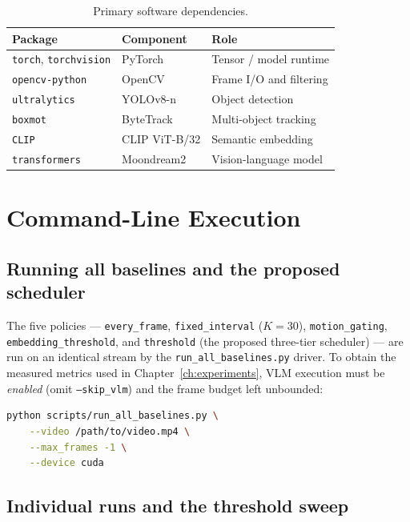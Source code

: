 \begin{table}[htbp]
\centering
\caption[Dependency registry]{Primary software dependencies.}
\label{tab:dependencies}
\small
\begin{tabular}{@{}lll@{}}
\toprule
\textbf{Package} & \textbf{Component} & \textbf{Role} \\
\midrule
\texttt{torch}, \texttt{torchvision} & PyTorch & Tensor / model runtime \\
\texttt{opencv-python}               & OpenCV  & Frame I/O and filtering \\
\texttt{ultralytics}                 & YOLOv8-n & Object detection \\
\texttt{boxmot}                      & ByteTrack & Multi-object tracking \\
\texttt{CLIP}                        & CLIP ViT-B/32 & Semantic embedding \\
\texttt{transformers}                & Moondream2 & Vision-language model \\
\bottomrule
\end{tabular}
\end{table}

\section{Command-Line Execution}
\label{sec:app-cli}

\subsection{Running all baselines and the proposed scheduler}
\label{sec:app-baseline}

The five policies --- \texttt{every\_frame}, \texttt{fixed\_interval}
($K=30$), \texttt{motion\_gating}, \texttt{embedding\_threshold}, and
\texttt{threshold} (the proposed three-tier scheduler) --- are run on an
identical stream by the \texttt{run\_all\_baselines.py} driver. To obtain the
measured metrics used in Chapter~\ref{ch:experiments}, VLM execution must be
\emph{enabled} (omit \texttt{--skip\_vlm}) and the frame budget left
unbounded:

\begin{lstlisting}[language=bash, caption={Run all five policies on the same video (VLM enabled, all frames).}]
python scripts/run_all_baselines.py \
    --video /path/to/video.mp4 \
    --max_frames -1 \
    --device cuda
\end{lstlisting}

\subsection{Individual runs and the threshold sweep}
\label{sec:app-proposed}

